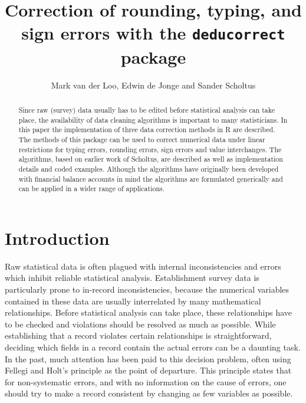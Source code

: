 \documentclass[11pt, fleqn, a4paper]{article}
\title{Correction of rounding, typing, and sign errors with the {\tt deducorrect} package}
\author{Mark van der Loo, Edwin de Jonge and Sander Scholtus}
\begin{document}
\maketitle
\begin{abstract}

Since raw (survey) data usually has to be edited before statistical analysis
can take place, the availability of data cleaning algorithms is important to
many statisticians.  In this paper the implementation of three data correction
methods in R are described. The methods of this package can be used to correct
numerical data under linear restrictions for typing errors, rounding errors,
sign errors and value interchanges. The algorithms, based on earlier work of
Scholtus, are described as well as implementation details and coded examples.
Although the algorithms have originally been developed with financial balance
accounts in mind the algorithms are formulated generically and can be applied
in a wider range of applications.


\end{abstract}

\maketitle

\newpage

\tableofcontents
\listofalgorithms
\newpage
\section{Introduction}
Raw statistical data  is often plagued with internal inconsistencies and errors
which inhibit reliable statistical analysis. Establishment survey data is
particularly prone to in-record inconsistencies, because the numerical
variables contained in these data are usually interrelated by many mathematical
relationships. Before statistical analysis can take place, these relationships
have to be checked and violations should be resolved as much as possible.
While establishing that a record violates certain relationships is
straightforward, deciding which fields in a record contain the actual errors
can be a daunting task. In the past, much attention has been paid to this
decision problem, often using Fellegi and Holt's principle \citep{fellegi:1976}
as the point of departure. This principle states that for non-systematic errors, and
with no information on the cause of errors, one should try to make a record
consistent by changing as few variables as possible.
\end{document}
